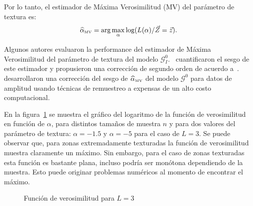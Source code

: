 Por lo tanto, el estimador de Máxima Verosimilitud (MV) del parámetro de textura es:
\begin{align}
\widehat{\alpha}_{{\text{\tiny{MV}}}}=\arg\max_{\alpha} \log(L(\alpha)/\vec{Z}=\vec{z}).
\end{align}

Algunos autores evaluaron la performance del estimador de Máxima Verosimilitud del parámetro de textura del modelo  $\mathcal G_I^0$.~\citet{VasconcellosFrerySilva:CompStat} cuantificaron el sesgo de este estimador y propusieron una corrección de segundo orden de acuerdo a~\citet{cox1968}.~\citet{CribariFrerySilva:CSDA} desarrollaron una corrección del sesgo de $\widehat{\alpha}_{\text{{\text{\tiny{MV}}}}}$ del modelo $\mathcal G^0$ para datos de amplitud usando técnicas de remuestreo a expensas de un alto costo computacional.

En la figura~\ref{MV} se muestra el gráfico del logaritmo de la función de verosimilitud en función de $\alpha$, para distintos tamaños de muestra $n$ y para dos valores del parámetro de textura: $\alpha=-1.5$ y $\alpha=-5$ para el caso de $L=3$. Se puede observar que, para zonas extremadamente texturadas la función de verosimilitud muestra claramente un máximo. Sin embargo, para el caso de zonas texturadas esta función es bastante plana, incluso podría ser monótona dependiendo de la muestra. Esto puede originar problemas numéricos al momento de encontrar el máximo.  

\begin{figure}[hbt]
	\centering    
	 \qquad
	\caption{\label{MV} Función de verosimilitud para $L=3$}
\end{figure}


